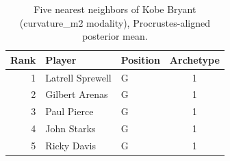 \begin{table}[htbp]
  \centering\small
  \begin{tabular}{rllc}
    \toprule
    Rank & Player & Position & Archetype \\
    \midrule
    1 & Latrell Sprewell & G & 1 \\
    2 & Gilbert Arenas & G & 1 \\
    3 & Paul Pierce & G & 1 \\
    4 & John Starks & G & 1 \\
    5 & Ricky Davis & G & 1 \\
    \bottomrule
  \end{tabular}
  \caption{Five nearest neighbors of Kobe Bryant (curvature_m2 modality), Procrustes-aligned posterior mean.}
  \label{tab:Kobe_Bryant_neighbors_curvature_m2}
\end{table}

